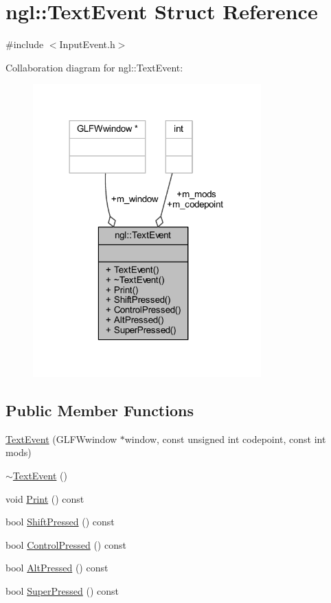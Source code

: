 \hypertarget{structngl_1_1_text_event}{}\section{ngl\+:\+:Text\+Event Struct Reference}
\label{structngl_1_1_text_event}


{\ttfamily \#include $<$Input\+Event.\+h$>$}



Collaboration diagram for ngl\+:\+:Text\+Event\+:
\nopagebreak
\begin{figure}[H]
\begin{center}
\leavevmode
\includegraphics[width=249pt]{structngl_1_1_text_event__coll__graph}
\end{center}
\end{figure}
\subsection*{Public Member Functions}
\begin{DoxyCompactItemize}
\item 
\mbox{\hyperlink{structngl_1_1_text_event_a6609168f68c58c4337f77d5d898cfd09}{Text\+Event}} (G\+L\+F\+Wwindow $\ast$window, const unsigned int codepoint, const int mods)
\item 
\mbox{\hyperlink{structngl_1_1_text_event_a3d6b1f9f96206294fc4081b53d493303}{$\sim$\+Text\+Event}} ()
\item 
void \mbox{\hyperlink{structngl_1_1_text_event_ae9899d823347381566c54c50042b52fd}{Print}} () const
\item 
bool \mbox{\hyperlink{structngl_1_1_text_event_ac6c853fa172cded024180ff6f3a591c9}{Shift\+Pressed}} () const
\item 
bool \mbox{\hyperlink{structngl_1_1_text_event_ab2565e7b774093c30b8a7bae3a1e4d29}{Control\+Pressed}} () const
\item 
bool \mbox{\hyperlink{structngl_1_1_text_event_ada6fad0d47e2a509e28f9ceac316e4f2}{Alt\+Pressed}} () const
\item 
bool \mbox{\hyperlink{structngl_1_1_text_event_a8296f51bf774fefa15d9f6e7ee33e4de}{Super\+Pressed}} () const
\end{DoxyCompactItemize}
